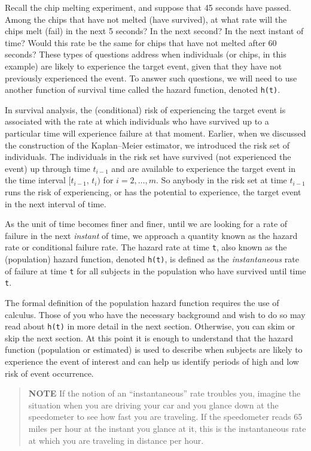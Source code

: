 \documentclass[
]{report}
\begin{document}
Recall the chip melting experiment, and suppose that 45 seconds have passed. Among the chips that have not melted (have survived), at what rate will the chips melt (fail) in the next 5 seconds? In the next second? In the next instant of time? Would this rate be the same for chips that have not melted after 60 seconds? These types of questions address when individuals (or chips, in this example) are likely to experience the target event, given that they have not previously experienced the event. To answer such questions, we will need to use another function of survival time called the hazard function, denoted \texttt{h(t)}.

In survival analysis, the (conditional) risk of experiencing the target event is associated with the rate at which individuals who have survived up to a particular time will experience failure at that moment. Earlier, when we discussed the construction of the Kaplan--Meier estimator, we introduced the risk set of individuals. The individuals in the risk set have survived (not experienced the event) up through time \(t_{i-1}\) and are available to experience the target event in the time interval \([t_{i-1},\,t_i)\) for \(i = 2, \dots, m\). So anybody in the risk set at time \(t_{i-1}\) runs the risk of experiencing, or has the potential to experience, the target event in the next interval of time.

As the unit of time becomes finer and finer, until we are looking for a rate of failure in the next \emph{instant} of time, we approach a quantity known as the hazard rate or conditional failure rate. The hazard rate at time \texttt{t}, also known as the (population) hazard function, denoted \texttt{h(t)}, is defined as the \emph{instantaneous} rate of failure at time \texttt{t} for all subjects in the population who have survived until time \texttt{t}.

The formal definition of the population hazard function requires the use of calculus. Those of you who have the necessary background and wish to do so may read about \texttt{h(t)} in more detail in the next section. Otherwise, you can skim or skip the next section. At this point it is enough to understand that the hazard function (population or estimated) is used to describe when subjects are likely to experience the event of interest and can help us identify periods of high and low risk of event occurrence.

\begin{quote}
\textbf{NOTE}
If the notion of an ``instantaneous'' rate troubles you, imagine the situation when you are driving your car and you glance down at the speedometer to see how fast you are traveling. If the speedometer reads 65 miles per hour at the instant you glance at it, this is the instantaneous rate at which you are traveling in distance per hour.
\end{quote}
\end{document}
